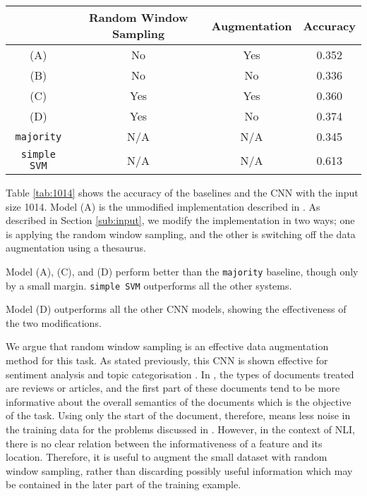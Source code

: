 
\begin{table*}[h]
\centering
\caption{Accuracy of Models with Input Size 1014}
\label{tab:1014}
\begin{tabular}{cccc}
& Random Window Sampling & Augmentation  & Accuracy \\ \hline
(A)& No                     & Yes                & 0.352      \\
(B)& No                     & No                 &0.336     \\
(C)& Yes                     & Yes                &  0.360    \\
(D)& Yes                    & No                 & 0.374 \\
\texttt{majority} & N/A & N/A & 0.345 \\
\texttt{simple SVM} & N/A & N/A & 0.613
\end{tabular}
\end{table*}
Table \ref{tab:1014} shows the accuracy of the baselines and the CNN with the input size 1014.
Model (A) is the unmodified implementation described in \citep{zhang2015character}.
As described in Section \ref{sub:input}, we modify the implementation in two ways; one is applying the random window sampling, and the other is switching off the data augmentation using a thesaurus.

Model (A), (C), and (D) perform better than the \texttt{majority} baseline, though only by a small margin.
\texttt{simple SVM} outperforms all the other systems.

Model (D) outperforms all the other CNN models, showing the effectiveness of the two modifications.

We argue that random window sampling is an effective data augmentation method for this task.
As stated previously, this CNN is shown effective for sentiment analysis and topic categorisation \citep{zhang2015character}.
In \citep{zhang2015character}, the types of documents treated are reviews or articles, and the first part of these documents tend to be more informative about the overall semantics of the documents which is the objective of the task.
Using only the start of the document, therefore, means less noise in the training data for the problems discussed in \citep{zhang2015character}.
However, in the context of NLI, there is no clear relation between the informativeness of a feature and its location.
Therefore, it is useful to augment the small dataset with random window sampling, rather than discarding possibly useful information which may be contained in the later part of the training example.

